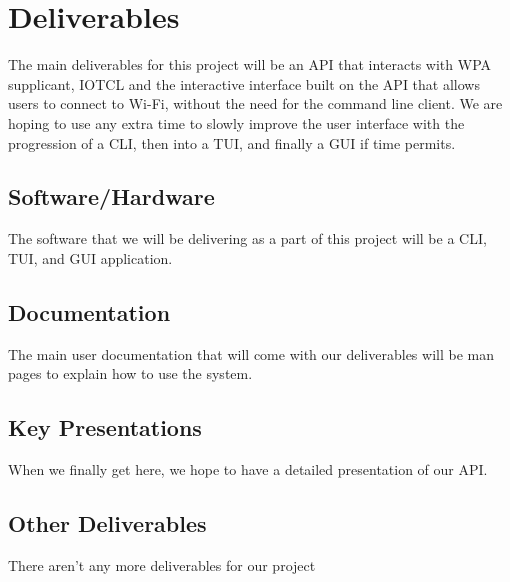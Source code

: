 \section{Deliverables}

The main deliverables for this project will be an API that interacts with WPA supplicant, IOTCL and the interactive interface built 
on the API that allows users to connect to Wi-Fi, without the need for the command line client. We are hoping to use any extra time 
to slowly improve the user interface with the progression of a CLI, then into a TUI, and finally a GUI if time permits. 

\subsection{Software/Hardware}

The software that we will be delivering as a part of this project will be a CLI, TUI, and GUI application.

\subsection{Documentation}

The main user documentation that will come with our deliverables will be man pages to explain how to use the system.

\subsection{Key Presentations}

When we finally get here, we hope to have a detailed presentation of our API. 

\subsection{Other Deliverables}

There aren't any more deliverables for our project
